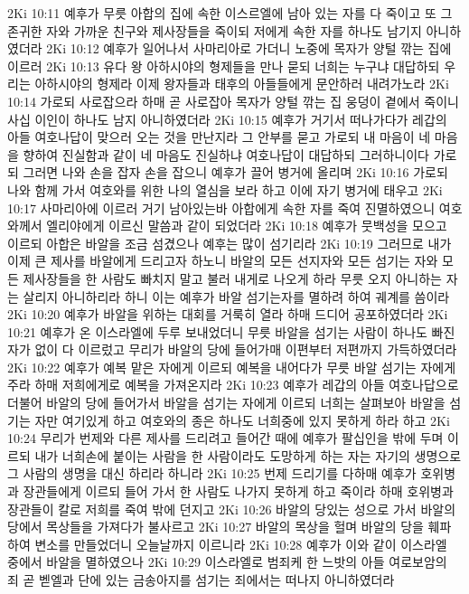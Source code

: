 2Ki 10:11  예후가 무릇 아합의 집에 속한 이스르엘에 남아 있는 자를 다 죽이고 또 그 존귀한 자와 가까운 친구와 제사장들을 죽이되 저에게 속한 자를 하나도 남기지 아니하였더라
2Ki 10:12  예후가 일어나서 사마리아로 가더니 노중에 목자가 양털 깎는 집에 이르러
2Ki 10:13  유다 왕 아하시야의 형제들을 만나 묻되 너희는 누구냐 대답하되 우리는 아하시야의 형제라 이제 왕자들과 태후의 아들들에게 문안하러 내려가노라
2Ki 10:14  가로되 사로잡으라 하매 곧 사로잡아 목자가 양털 깎는 집 웅덩이 곁에서 죽이니 사십 이인이 하나도 남지 아니하였더라
2Ki 10:15  예후가 거기서 떠나가다가 레갑의 아들 여호나답이 맞으러 오는 것을 만난지라 그 안부를 묻고 가로되 내 마음이 네 마음을 향하여 진실함과 같이 네 마음도 진실하냐 여호나답이 대답하되 그러하니이다 가로되 그러면 나와 손을 잡자 손을 잡으니 예후가 끌어 병거에 올리며
2Ki 10:16  가로되 나와 함께 가서 여호와를 위한 나의 열심을 보라 하고 이에 자기 병거에 태우고
2Ki 10:17  사마리아에 이르러 거기 남아있는바 아합에게 속한 자를 죽여 진멸하였으니 여호와께서 엘리야에게 이르신 말씀과 같이 되었더라
2Ki 10:18  예후가 뭇백성을 모으고 이르되 아합은 바알을 조금 섬겼으나 예후는 많이 섬기리라
2Ki 10:19  그러므로 내가 이제 큰 제사를 바알에게 드리고자 하노니 바알의 모든 선지자와 모든 섬기는 자와 모든 제사장들을 한 사람도 빠치지 말고 불러 내게로 나오게 하라 무릇 오지 아니하는 자는 살리지 아니하리라 하니 이는 예후가 바알 섬기는자를 멸하려 하여 궤계를 씀이라
2Ki 10:20  예후가 바알을 위하는 대회를 거룩히 열라 하매 드디어 공포하였더라
2Ki 10:21  예후가 온 이스라엘에 두루 보내었더니 무릇 바알을 섬기는 사람이 하나도 빠진 자가 없이 다 이르렀고 무리가 바알의 당에 들어가매 이편부터 저편까지 가득하였더라
2Ki 10:22  예후가 예복 맡은 자에게 이르되 예복을 내어다가 무릇 바알 섬기는 자에게 주라 하매 저희에게로 예복을 가져온지라
2Ki 10:23  예후가 레갑의 아들 여호나답으로 더불어 바알의 당에 들어가서 바알을 섬기는 자에게 이르되 너희는 살펴보아 바알을 섬기는 자만 여기있게 하고 여호와의 종은 하나도 너희중에 있지 못하게 하라 하고
2Ki 10:24  무리가 번제와 다른 제사를 드리려고 들어간 때에 예후가 팔십인을 밖에 두며 이르되 내가 너희손에 붙이는 사람을 한 사람이라도 도망하게 하는 자는 자기의 생명으로 그 사람의 생명을 대신 하리라 하니라
2Ki 10:25  번제 드리기를 다하매 예후가 호위병과 장관들에게 이르되 들어 가서 한 사람도 나가지 못하게 하고 죽이라 하매 호위병과 장관들이 칼로 저희를 죽여 밖에 던지고
2Ki 10:26  바알의 당있는 성으로 가서 바알의 당에서 목상들을 가져다가 불사르고
2Ki 10:27  바알의 목상을 헐며 바알의 당을 훼파하여 변소를 만들었더니 오늘날까지 이르니라
2Ki 10:28  예후가 이와 같이 이스라엘 중에서 바알을 멸하였으나
2Ki 10:29  이스라엘로 범죄케 한 느밧의 아들 여로보암의 죄 곧 벧엘과 단에 있는 금송아지를 섬기는 죄에서는 떠나지 아니하였더라
